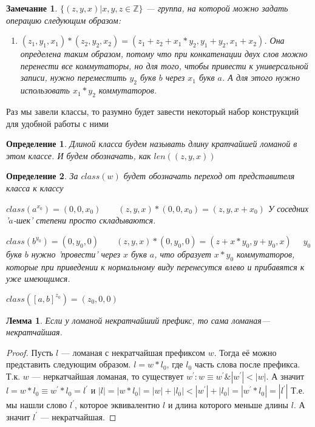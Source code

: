 \documentclass[12pt,a4paper, flushleft]{article}
\newtheorem{Def}{Определение}[section]
\newtheorem{Lm}{Лемма}[section]
\newtheorem{Zm}{Замечание}[section]
\newcommand{\p}[1]{#1^{\prime}}
\begin{document}
\begin{Zm}
	$\{(z, y, x)| x, y, z \in \mathds{Z}\}$ --- группа, на которой можно задать операцию следующим образом:
	\begin{enumerate}
		\item[] $(z_1, y_1, x_1) * (z_2, y_2, x_2) = (z_1 + z_2 + x_1*y_2, y_1 + y_2, x_1 + x_2)$. Она определена таким образом, потому что при конкатенации двух слов можно перенести все коммутаторы, но для того, чтобы привести к универсальной записи, нужно переместить $y_2$ букв $b$ через $x_1$ букв $a$. А для этого нужно использовать $x_1*y_2$ коммутаторов.
	\end{enumerate}
\end{Zm}

Раз мы завели классы, то разумно будет завести некоторый набор конструкций для удобной работы с ними

\begin{Def}
	Длиной класса будем называть длину кратчайшей ломаной в этом классе. И будем обозначать, как $len((z, y, x))$
\end{Def}

\begin{Def}
	За $class(w)$ будет обозначать переход от представителя класса к классу
	
	$class(a^{x_0}) = (0, 0, x_0)\qquad (z, y, x) * (0, 0, x_0) = (z, y, x+x_0)$ У соседних '$a$-шек' степени просто складываются.
	
	$class(b^{y_0}) = (0, y_0, 0)\qquad (z, y, x) * (0, y_0, 0) = (z + x*y_0, y+y_0, x)$ $\quad y_0$ букв $b$ нужно 'провести' через $x$ букв $a$, что образует $x*y_0$ коммутаторов, которые при приведении к нормальному виду перенесутся влево и прибавятся к уже имеющимся.
	
	$class([a, b]^{z_0}) = (z_0, 0, 0)$
\end{Def}

\begin{Lm}
	Если у ломаной некратчайший префикс, то сама ломаная--- некратчайшая.
\end{Lm}
\begin{proof}
	Пусть $l$ --- ломаная с некратчайшая префиксом $w$. Тогда её можно представить следующим образом. $l = w * l_0$, где $l_0$ часть слова после префикса. Т.к. $w$ --- неркатчайшая ломаная, то существует $\p w: w\equiv \p w\& |\p w|<|w|$. А значит $l = w*l_0\equiv \p w*l_0 = \p l$ и $|l| = |w*l_0| = |w| + |l_0| < |\p w| + |l_0| = |\p w*l_0| = |\p l|$ Т.е. мы нашли слово $\p l$, которое эквивалентно $l$ и длина которого меньше длины $l$. А значит $\p l$ --- некратчайшая.
\end{proof}
\end{document}
